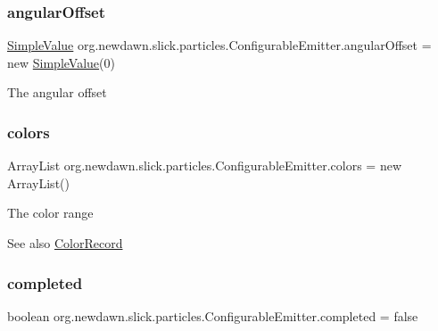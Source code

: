 \subsubsection{\texorpdfstring{angular\+Offset}{angularOffset}}
{\footnotesize\ttfamily \mbox{\hyperlink{classorg_1_1newdawn_1_1slick_1_1particles_1_1_configurable_emitter_1_1_simple_value}{Simple\+Value}} org.\+newdawn.\+slick.\+particles.\+Configurable\+Emitter.\+angular\+Offset = new \mbox{\hyperlink{classorg_1_1newdawn_1_1slick_1_1particles_1_1_configurable_emitter_1_1_simple_value}{Simple\+Value}}(0)}

The angular offset \mbox{\label{classorg_1_1newdawn_1_1slick_1_1particles_1_1_configurable_emitter_ae21dcdf76a4ba4cf50f4c2bc1bc7ebaa}} 
\subsubsection{\texorpdfstring{colors}{colors}}
{\footnotesize\ttfamily Array\+List org.\+newdawn.\+slick.\+particles.\+Configurable\+Emitter.\+colors = new Array\+List()}

The color range

\begin{DoxySeeAlso}{See also}
\mbox{\hyperlink{classorg_1_1newdawn_1_1slick_1_1particles_1_1_configurable_emitter_1_1_color_record}{Color\+Record}} 
\end{DoxySeeAlso}
\mbox{\label{classorg_1_1newdawn_1_1slick_1_1particles_1_1_configurable_emitter_a0d383b122bb4a38c176b039e3264def3}} 
\subsubsection{\texorpdfstring{completed}{completed}}
{\footnotesize\ttfamily boolean org.\+newdawn.\+slick.\+particles.\+Configurable\+Emitter.\+completed = false\hspace{0.3cm}{\ttfamily [protected]}}

